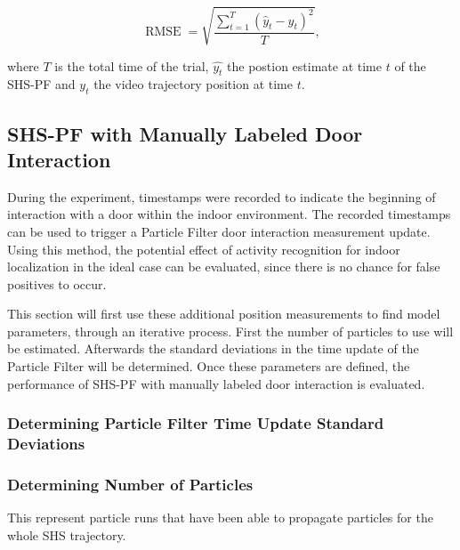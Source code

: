 \begin{equation}
	\displaystyle \operatorname {RMSE} ={\sqrt {\frac {\sum _{t=1}^{T}({\hat {y}}_{t}-y_{t})^{2}}{T}}},
	\label{eq:RMSE}
\end{equation}

where $T$ is the total time of the trial, $\hat{y_t}$ the postion estimate at time $t$ of the SHS-PF and $y_t$ the video trajectory position at time $t$.

\subsection{SHS-PF with Manually Labeled Door Interaction}
\label{sec:results-SHS_PF_manually indicated}
During the experiment, timestamps were recorded to indicate the beginning of interaction with a door within the indoor environment. The recorded timestamps can be used to trigger a Particle Filter door interaction measurement update. Using this method, the potential effect of activity recognition for indoor localization in the ideal case can be evaluated, since there is no chance for false positives to occur.\par

This section will first use these additional position measurements to find model parameters, through an iterative process. First the number of particles to use will be estimated. Afterwards the standard deviations in the time update of the Particle Filter will be determined. Once these parameters are defined, the performance of SHS-PF with manually labeled door interaction is evaluated.

\subsubsection{Determining Particle Filter Time Update Standard Deviations}

\subsubsection{Determining Number of Particles}

This represent particle runs that have been able to propagate particles for the whole \ac{SHS} trajectory.
 
